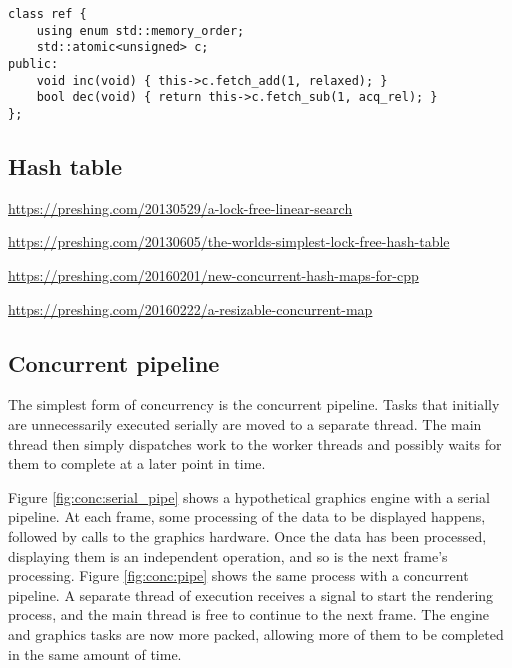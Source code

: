 \begin{lstlisting}[style=c++]
class ref {
    using enum std::memory_order;
    std::atomic<unsigned> c;
public:
    void inc(void) { this->c.fetch_add(1, relaxed); }
    bool dec(void) { return this->c.fetch_sub(1, acq_rel); }
};
\end{lstlisting}

\subsection{Hash table}

\url{https://preshing.com/20130529/a-lock-free-linear-search}

\url{https://preshing.com/20130605/the-worlds-simplest-lock-free-hash-table}

\url{https://preshing.com/20160201/new-concurrent-hash-maps-for-cpp}

\url{https://preshing.com/20160222/a-resizable-concurrent-map}

\subsection{Concurrent pipeline}

The simplest form of concurrency is the concurrent pipeline.  Tasks that
initially are unnecessarily executed serially are moved to a separate thread.
The main thread then simply dispatches work to the worker threads and possibly
waits for them to complete at a later point in time.

Figure \ref{fig:conc:serial_pipe} shows a hypothetical graphics engine with a
serial pipeline.  At each frame, some processing of the data to be displayed
happens, followed by calls to the graphics hardware.  Once the data has been
processed, displaying them is an independent operation, and so is the next
frame's processing.  Figure \ref{fig:conc:pipe} shows the same process with a
concurrent pipeline.  A separate thread of execution receives a signal to start
the rendering process, and the main thread is free to continue to the next
frame.  The engine and graphics tasks are now more packed, allowing more of them
to be completed in the same amount of time.

